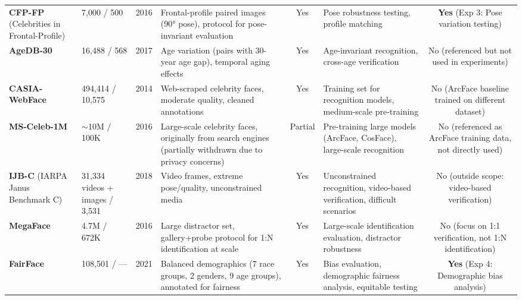 \begin{longtable}{p{}p{}cp{}cp{}c}
\textbf{CFP-FP} (Celebrities in Frontal-Profile) \cite{sengupta2016cfp} & 7,000 / 500 & 2016 & Frontal-profile paired images (90° pose), protocol for pose-invariant evaluation & Yes & Pose robustness testing, profile matching & \textbf{Yes} (Exp 3: Pose variation testing) \\[6pt]

\textbf{AgeDB-30} \cite{moschoglou2017agedb} & 16,488 / 568 & 2017 & Age variation (pairs with 30-year age gap), temporal aging effects & Yes & Age-invariant recognition, cross-age verification & No (referenced but not used in experiments) \\[6pt]

\textbf{CASIA-WebFace} \cite{yi2014casia} & 494,414 / 10,575 & 2014 & Web-scraped celebrity faces, moderate quality, cleaned annotations & Yes & Training set for recognition models, medium-scale pre-training & No (ArcFace baseline trained on different dataset) \\[6pt]

\textbf{MS-Celeb-1M} \cite{guo2016msceleb} & $\sim$10M / 100K & 2016 & Large-scale celebrity faces, originally from search engines (partially withdrawn due to privacy concerns) & Partial & Pre-training large models (ArcFace, CosFace), large-scale recognition & No (referenced as ArcFace training data, not directly used) \\[6pt]

\textbf{IJB-C} (IARPA Janus Benchmark C) \cite{maze2018ijbc} & 31,334 videos + images / 3,531 & 2018 & Video frames, extreme pose/quality, unconstrained media & Yes & Unconstrained recognition, video-based verification, difficult scenarios & No (outside scope: video-based verification) \\[6pt]

\textbf{MegaFace} \cite{kemelmacher2016megaface} & 4.7M / 672K & 2016 & Large distractor set, gallery+probe protocol for 1:N identification at scale & Yes & Large-scale identification evaluation, distractor robustness & No (focus on 1:1 verification, not 1:N identification) \\[6pt]

\textbf{FairFace} \cite{karkkainen2021fairface} & 108,501 / — & 2021 & Balanced demographics (7 race groups, 2 genders, 9 age groups), annotated for fairness & Yes & Bias evaluation, demographic fairness analysis, equitable testing & \textbf{Yes} (Exp 4: Demographic bias analysis) \\

\end{longtable}

